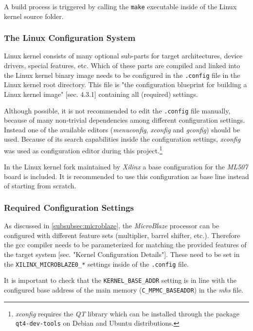 A build process is triggered by calling the \texttt{make} executable inside of the Linux kernel source folder.

\subsubsection{The Linux Configuration System}

Linux kernel consists of many optional sub-parts for target architectures, device drivers, special features, etc. Which of these parts are compiled and linked into the Linux kernel binary image needs to be configured in the \texttt{.config} file in the Linux kernel root directory. This file is "the configuration blueprint for building a Linux kernel image" \cite{linuxPrimer}[sec. 4.3.1] containing all (required) settings.

Although possible, it is not recommended to edit the \texttt{.config} file manually, because of many non-trivial dependencies among different configuration settings. Instead one of the available editors (\textit{menuconfig}, \textit{xconfig} and \textit{gconfig}) should be used. Because of its search capabilities inside the configuration settings, \textit{xconfig} was used as configuration editor during this project.\footnote{\textit{xconfig} requires the \textit{QT} library which can be installed through the package \texttt{qt4-dev-tools} on Debian and Ubuntu distributions.}

In the Linux kernel fork maintained by \textit{Xilinx} a base configuration for the \textit{ML507} board is included. It is recommended to use this configuration as base line instead of starting from scratch.

\subsubsection{Required Configuration Settings}
\label{subsubsec:req_config}

As discussed in \ref{subsubsec:microblaze}, the \textit{MicroBlaze} processor can be configured with different feature sets (multiplier, barrel shifter, etc.). Therefore the \gls{gcc} compiler needs to be parameterized for matching the provided features of the target system \cite{mb_linux}[sec. "Kernel Configuration Details"]. These need to be set in the \texttt{XILINX\_MICROBLAZE0\_*} settings inside of the \texttt{.config} file.

It is important to check that the \texttt{KERNEL\_BASE\_ADDR} setting is in line with the configured base address of the main memory (\texttt{C\_MPMC\_BASEADDR}) in the \textit{\gls{mhs}} file.

